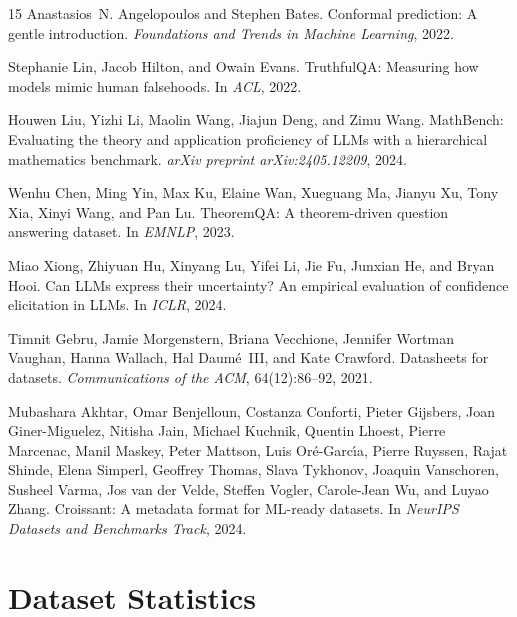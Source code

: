 \documentclass{article}
\begin{document}
\begin{thebibliography}{15}
Anastasios~N. Angelopoulos and Stephen Bates.
\newblock Conformal prediction: A gentle introduction.
\newblock \emph{Foundations and Trends in Machine Learning}, 2022.

Stephanie Lin, Jacob Hilton, and Owain Evans.
\newblock TruthfulQA: Measuring how models mimic human falsehoods.
\newblock In \emph{ACL}, 2022.

Houwen Liu, Yizhi Li, Maolin Wang, Jiajun Deng, and Zimu Wang.
\newblock MathBench: Evaluating the theory and application proficiency of LLMs with a hierarchical mathematics benchmark.
\newblock \emph{arXiv preprint arXiv:2405.12209}, 2024.

Wenhu Chen, Ming Yin, Max Ku, Elaine Wan, Xueguang Ma, Jianyu Xu, Tony Xia, Xinyi Wang, and Pan Lu.
\newblock TheoremQA: A theorem-driven question answering dataset.
\newblock In \emph{EMNLP}, 2023.

Miao Xiong, Zhiyuan Hu, Xinyang Lu, Yifei Li, Jie Fu, Junxian He, and Bryan Hooi.
\newblock Can LLMs express their uncertainty? An empirical evaluation of confidence elicitation in LLMs.
\newblock In \emph{ICLR}, 2024.

Timnit Gebru, Jamie Morgenstern, Briana Vecchione, Jennifer Wortman Vaughan, Hanna Wallach, Hal Daum{\'e}~III, and Kate Crawford.
\newblock Datasheets for datasets.
\newblock \emph{Communications of the ACM}, 64(12):86--92, 2021.

Mubashara Akhtar, Omar Benjelloun, Costanza Conforti, Pieter Gijsbers, Joan Giner-Miguelez, Nitisha Jain, Michael Kuchnik, Quentin Lhoest, Pierre Marcenac, Manil Maskey, Peter Mattson, Luis Or{\'e}-Garc{\'\i}a, Pierre Ruyssen, Rajat Shinde, Elena Simperl, Geoffrey Thomas, Slava Tykhonov, Joaquin Vanschoren, Susheel Varma, Jos van der Velde, Steffen Vogler, Carole-Jean Wu, and Luyao Zhang.
\newblock Croissant: A metadata format for ML-ready datasets.
\newblock In \emph{NeurIPS Datasets and Benchmarks Track}, 2024.

\end{thebibliography}


\appendix

\section{Dataset Statistics}
\label{app:statistics}
\end{document}
